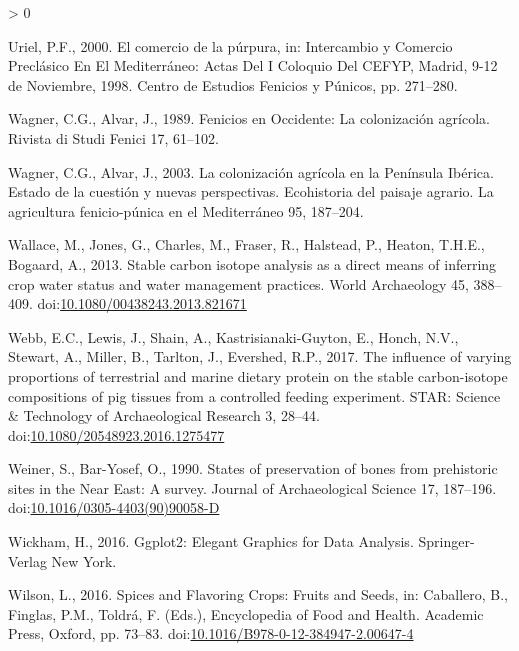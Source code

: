 \documentclass[5p]{elsarticle} %
\newlength{\cslhangindent}
\newenvironment{CSLReferences}[2] %
 {%
  \setlength{\parindent}{0pt}
  \ifodd #1 \everypar{\setlength{\hangindent}{\cslhangindent}}\ignorespaces\fi
  \ifnum #2 > 0
  \setlength{\parskip}{#2\baselineskip}
  \fi
 }%
 {}
\begin{document}
\begin{CSLReferences}{1}{0}
\leavevmode\hypertarget{ref-uriel00}{}%
Uriel, P.F., 2000. El comercio de la púrpura, in: Intercambio y Comercio Preclásico En El {Mediterráneo}: Actas Del {I} Coloquio Del {CEFYP}, {Madrid}, 9-12 de Noviembre, 1998. {Centro de Estudios Fenicios y Púnicos}, pp. 271--280.

\leavevmode\hypertarget{ref-wagner_alvar89}{}%
Wagner, C.G., Alvar, J., 1989. Fenicios en {Occidente}: La colonización agrícola. Rivista di Studi Fenici 17, 61--102.

\leavevmode\hypertarget{ref-wagner_alvar03}{}%
Wagner, C.G., Alvar, J., 2003. La colonización agrícola en la {Península Ibérica}. {Estado} de la cuestión y nuevas perspectivas. Ecohistoria del paisaje agrario. La agricultura fenicio-púnica en el Mediterráneo 95, 187--204.

\leavevmode\hypertarget{ref-wallace_etal13}{}%
Wallace, M., Jones, G., Charles, M., Fraser, R., Halstead, P., Heaton, T.H.E., Bogaard, A., 2013. Stable carbon isotope analysis as a direct means of inferring crop water status and water management practices. World Archaeology 45, 388--409. doi:\href{https://doi.org/10.1080/00438243.2013.821671}{10.1080/00438243.2013.821671}

\leavevmode\hypertarget{ref-webb_etal17a}{}%
Webb, E.C., Lewis, J., Shain, A., Kastrisianaki-Guyton, E., Honch, N.V., Stewart, A., Miller, B., Tarlton, J., Evershed, R.P., 2017. The influence of varying proportions of terrestrial and marine dietary protein on the stable carbon-isotope compositions of pig tissues from a controlled feeding experiment. STAR: Science \& Technology of Archaeological Research 3, 28--44. doi:\href{https://doi.org/10.1080/20548923.2016.1275477}{10.1080/20548923.2016.1275477}

\leavevmode\hypertarget{ref-weiner_bar-yosef90}{}%
Weiner, S., Bar-Yosef, O., 1990. States of preservation of bones from prehistoric sites in the {Near East}: {A} survey. Journal of Archaeological Science 17, 187--196. doi:\href{https://doi.org/10.1016/0305-4403(90)90058-D}{10.1016/0305-4403(90)90058-D}

\leavevmode\hypertarget{ref-wickham16}{}%
Wickham, H., 2016. Ggplot2: {Elegant Graphics} for {Data Analysis}. {Springer-Verlag New York}.

\leavevmode\hypertarget{ref-wilson16}{}%
Wilson, L., 2016. Spices and {Flavoring Crops}: {Fruits} and {Seeds}, in: Caballero, B., Finglas, P.M., Toldrá, F. (Eds.), Encyclopedia of {Food} and {Health}. {Academic Press}, {Oxford}, pp. 73--83. doi:\href{https://doi.org/10.1016/B978-0-12-384947-2.00647-4}{10.1016/B978-0-12-384947-2.00647-4}


\end{CSLReferences}
\end{document}
